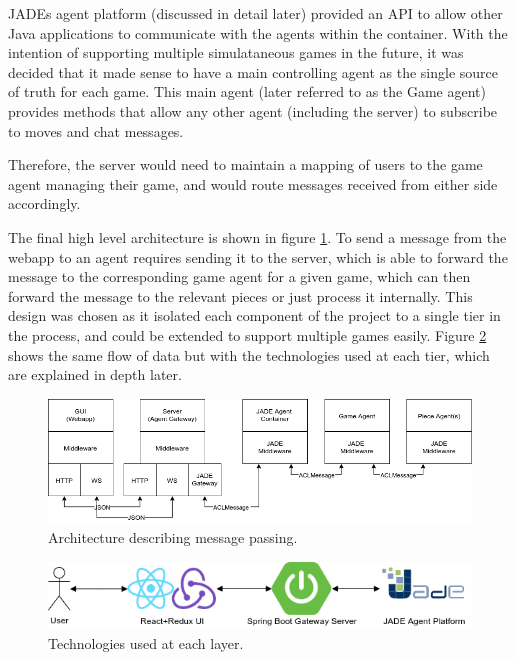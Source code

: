 \documentclass{article}
\begin{document}
JADEs agent platform (discussed in detail later) provided an API to allow other Java applications to communicate with the agents within the container. With the intention of supporting multiple simulataneous games in the future, it was decided that it made sense to have a main controlling agent as the single source of truth for each game. This main agent (later referred to as the Game agent) provides methods that allow any other agent (including the server) to subscribe to moves and chat messages.

Therefore, the server would need to maintain a mapping of users to the game agent managing their game, and would route messages received from either side accordingly. 

The final high level architecture is shown in figure \ref{fig:finalarchitecture}. To send a message from the webapp to an agent requires sending it to the server, which is able to forward the message to the corresponding game agent for a given game, which can then forward the message to the relevant pieces or just process it internally. This design was chosen as it isolated each component of the project to a single tier in the process, and could be extended to support multiple games easily. Figure \ref{fig:highlevelarchitecture} shows the same flow of data but with the technologies used at each tier, which are explained in depth later.

\begin{figure}[!ht]
	\centering
	\includegraphics[width=\linewidth]{images/stacks}
	\caption{Architecture describing message passing.}
	\label{fig:finalarchitecture}
\end{figure}

\begin{figure}[!ht]
	\centering
	\includegraphics[width=\linewidth]{images/highlevelarchitecture}
	\caption{Technologies used at each layer.}
	\label{fig:highlevelarchitecture}
\end{figure}
\end{document}
